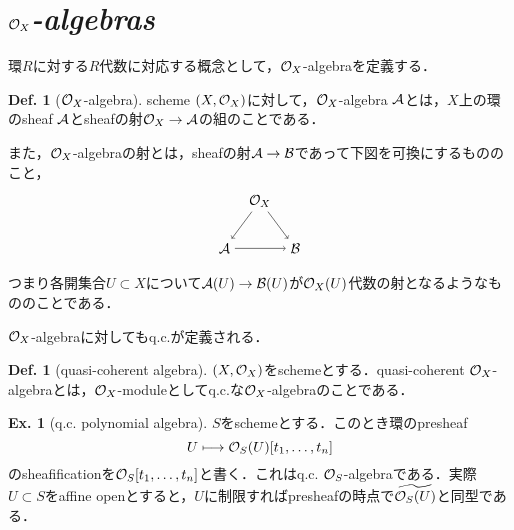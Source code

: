 \documentclass[dvipdfmx,b5paper,papersize]{jsarticle}
\theoremstyle{definition}
\newtheorem{defi}[thm]{Def.}
\newtheorem{ex}[thm]{Ex.}
\begin{document}
\section{${\cal{O}}_{X}$\it{-algebras}}
環$R$に対する$R$代数に対応する概念として，${\cal{O}}_{X}$-algebraを定義する．
\begin{defi}[${\cal{O}}_X$-algebra]
  scheme $(X,{\cal{O}}_X)$に対して，${\cal{O}}_X$-algebra $\cal{A}$とは，$X$上の環のsheaf $\cal{A}$とsheafの射${\cal{O}}_X \to \cal{A}$の組のことである．

  また，${\cal{O}}_X$-algebraの射とは，sheafの射$\cal{A} \to \cal{B}$であって下図を可換にするもののこと，
  \[
    \begin{tikzpicture}[auto,->]
      \node (a) at (0.9,1.2) {${\cal{O}}_X$};
      \node (b) at (0,0) {$\cal{A}$}; \node (y) at (1.8,0) {$\cal{B}$};


      \draw (a) -- node[swap] {$\scriptstyle $} (b);
      \draw (a) -- node[swap] {$\scriptstyle $} (y);
      \draw (b) -- node[swap] {$\scriptstyle $} (y);
  \end{tikzpicture}
  \]

  つまり各開集合$U \subset X$について${\cal{A}}(U) \to {\cal{B}}(U)$が${{\cal{O}}_X}(U)$代数の射となるようなもののことである．
\end{defi}
${\cal{O}}_X$-algebraに対してもq.c.が定義される．
\begin{defi}[quasi-coherent algebra]
  $(X,{\cal{O}}_X)$をschemeとする．quasi-coherent ${\cal{O}}_X$-algebraとは，${\cal{O}}_X$-moduleとしてq.c.な${\cal{O}}_X$-algebraのことである．

\end{defi}

\begin{ex}[q.c. polynomial algebra]
  $S$をschemeとする．このとき環のpresheaf
  \[
    U \longmapsto {\cal{O}}_S(U)[t_1,\dots ,t_n]
  \]
  のsheafificationを${\cal{O}}_S[t_1,\dots ,t_n]$と書く．これはq.c. ${\cal{O}}_S$-algebraである．実際$U \subset S$をaffine openとすると，$U$に制限すればpresheafの時点で${\widetilde{{\cal{O}}_S(U)}}$と同型である．
\end{ex}
\end{document}
